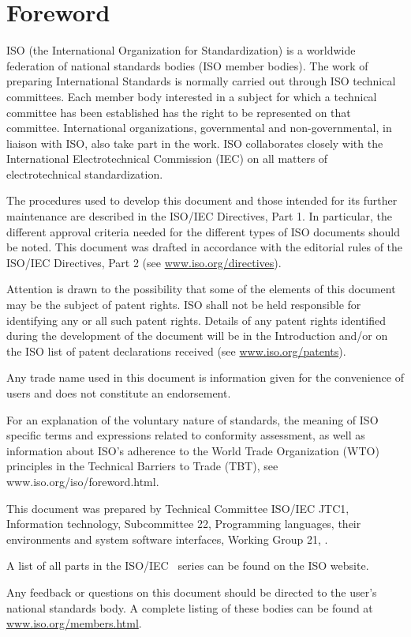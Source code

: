 \chapter{Foreword}

ISO (the International Organization for Standardization) is a worldwide
federation of national standards bodies (ISO member bodies). The work of
preparing International Standards is normally carried out through ISO technical
committees. Each member body interested in a subject for which a technical
committee has been established has the right to be represented on that
committee. International organizations, governmental and non-governmental, in
liaison with ISO, also take part in the work. ISO collaborates closely with the
International Electrotechnical Commission (IEC) on all matters of
electrotechnical standardization.

The procedures used to develop this document and those intended for its further
maintenance are described in the ISO/IEC Directives, Part 1. In particular, the
different approval criteria needed for the different types of ISO documents
should be noted. This document was drafted in accordance with the editorial
rules of the ISO/IEC Directives, Part 2 (see \url{www.iso.org/directives}).

Attention is drawn to the possibility that some of the elements of this document
may be the subject of patent rights. ISO shall not be held responsible for
identifying any or all such patent rights. Details of any patent rights
identified during the development of the document will be in the Introduction
and/or on the ISO list of patent declarations received
(see \url{www.iso.org/patents}).

Any trade name used in this document is information given for the convenience of
users and does not constitute an endorsement.

For an explanation of the voluntary nature of standards, the meaning of ISO
specific terms and expressions related to conformity assessment, as well as
information about ISO's adherence to the World Trade Organization (WTO)
principles in the Technical Barriers to Trade (TBT),
see www.iso.org/iso/foreword.html.

This document was prepared by Technical Committee ISO/IEC JTC1, Information
technology, Subcommittee 22, Programming languages, their environments and
system software interfaces, Working Group 21, \Cpp.



A list of all parts in the ISO/IEC \disno\ series can be found on the ISO
website.

Any feedback or questions on this document should be directed to the user's
national standards body. A complete listing of these bodies can be found at
\url{www.iso.org/members.html}.
